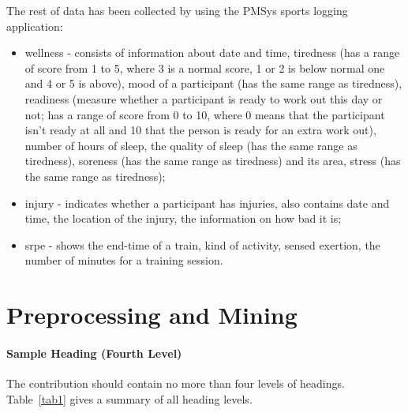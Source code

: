 \documentclass[runningheads]{llncs}
\begin{document}
The rest of data has been collected by using the PMSys sports logging application:
\begin{itemize}
    \item wellness - consists of information about date and time, tiredness (has a range of score from 1 to 5, where 3 is a normal score, 1 or 2 is below normal one and 4 or 5 is above), mood of a participant (has the same range as tiredness), readiness (measure whether a participant is ready to work out this day or not; has a range of score from 0 to 10, where 0 means that the participant isn't ready at all and 10 that the person is ready for an extra work out), number of hours of sleep, the quality of sleep (has the same range as tiredness), soreness (has the same range as tiredness) and its area, stress (has the same range as tiredness);
    \item injury - indicates whether a participant has injuries, also contains date and time, the location of the injury, the information on how bad it is;
    \item srpe - shows the end-time of a train, kind of activity, sensed exertion, the number of minutes for a training session.
\end{itemize}

\section{Preprocessing and Mining}




\paragraph{Sample Heading (Fourth Level)}
The contribution should contain no more than four levels of
headings. Table~\ref{tab1} gives a summary of all heading levels.
\end{document}
